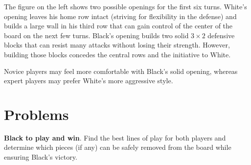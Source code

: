 \documentclass[a4paper,12pt]{article}
\begin{document}
    \begin{minipage}[c]{0.36\linewidth}
        \begin{center}
            \begin{othelloboardnorefs}{0.75}
            \end{othelloboardnorefs}
        \end{center}
    \end{minipage}
    \hfill
    \begin{minipage}[c]{0.62\linewidth}
        The figure on the left shows two possible openings for the first six turns.  White's opening leaves his home row intact (striving for flexibility in the defense) and builds a large wall in his third row that can gain control of the center of the board on the next few turns.  Black's opening builds two solid $3\!\times\!2$ defensive blocks that can resist many attacks without losing their strength. However, building those blocks concedes the central rows and the initiative to White.

        Novice players may feel more comfortable with Black's solid opening, whereas expert players may prefer White's more aggressive style.
    \end{minipage}


\newpage


    \section{Problems}

    \textbf{Black to play and win}.  Find the best lines of play for both players and determine which pieces (if any) can be safely removed from the board while ensuring Black's victory.
\end{document}
